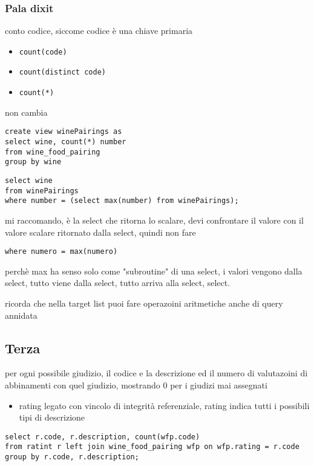 \documentclass[11pt]{article}
\begin{document}
\subsubsection{Pala dixit}
\label{sec:org5bb020b}
conto codice, siccome codice è una chiave primaria
\begin{itemize}
\item \texttt{count(code)}
\item \texttt{count(distinct code)}
\item \texttt{count(*)}
\end{itemize}
non cambia   

\begin{verbatim}
create view winePairings as
select wine, count(*) number
from wine_food_pairing
group by wine
\end{verbatim}

\begin{verbatim}
select wine
from winePairings
where number = (select max(number) from winePairings);
\end{verbatim}

mi raccomando, è la select che ritorna lo scalare, devi confrontare il valore con il
valore scalare ritornato dalla select, quindi non fare
\begin{verbatim}
where numero = max(numero)
\end{verbatim}
perchè max ha senso solo come "subroutine" di una select, i valori vengono dalla select,
tutto viene dalla select, tutto arriva alla select, select.

ricorda che nella target list puoi fare operazoini aritmetiche anche di query annidata

\subsection{Terza}
\label{sec:org4c6b87e}

per ogni possibile giudizio, il codice e la descrizione ed il numero di valutazoini di
abbinamenti con quel giudizio, mostrando 0 per i giudizi mai assegnati

\begin{itemize}
\item rating legato con vincolo di integrità referenziale, rating indica tutti i possibili
tipi di descrizione
\end{itemize}

\begin{verbatim}
select r.code, r.description, count(wfp.code)
from ratint r left join wine_food_pairing wfp on wfp.rating = r.code
group by r.code, r.description;
\end{verbatim}
\end{document}
